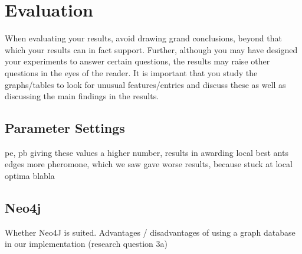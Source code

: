 \section{Evaluation}

When evaluating your results, avoid drawing grand conclusions, beyond that which your results can in fact support. Further, although you may have designed your experiments to answer certain questions, the results may raise other questions in the eyes of the reader. It is important that you study the graphs/tables to look for unusual features/entries and discuss these as well as discussing the main findings in the results. 

\subsection{Parameter Settings}

pe, pb giving these values a higher number, results in awarding local best ants edges more pheromone, which we saw gave worse results, because stuck at local optima blabla


\subsection{Neo4j}

Whether Neo4J is suited. Advantages / disadvantages of using a graph database in our implementation (research question 3a)